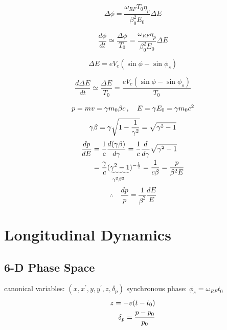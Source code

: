 \documentclass[10pt,a4paper]{ltjsarticle}
\begin{document}
\begin{equation}
    \Delta \phi = \frac{\omega_{RF} T_0 \eta_p}{\beta_0^2 E_0}\Delta E
\end{equation}

\begin{equation}
    \frac{d\phi}{dt} \simeq \frac{\Delta\phi}{T_0} = \frac{\omega_{RF}\eta_p}{\beta_0^2 E_0}\Delta E
\end{equation}

\begin{equation}
    \Delta E = e V_c (\sin \phi - \sin \phi_s)
\end{equation}

\begin{equation}
    \frac{d\Delta E}{dt} \simeq \frac{\Delta E}{T_0}= \frac{e V_c (\sin\phi - \sin\phi_s)}{T_0}
\end{equation}

\begin{tcolorbox}[title=式 (\ref{delta_p}) の導出]
    
    \begin{align}
        p = mv = \gamma m_0 \beta c\,  , \quad E = \gamma E_0 = \gamma m_0 c^2 \notag
    \end{align}
    \begin{equation}
        \gamma \beta = \gamma \sqrt{1-\frac{1}{\gamma^2}} \notag = \sqrt{\gamma^2 -1} \notag
    \end{equation}
    \begin{align}
        \frac{dp}{dE} & = \frac{1}{c}\frac{d(\gamma \beta)}{d\gamma} = \frac{1}{c}\frac{d}{d\gamma}\sqrt{\gamma^2 -1} \notag \\
        & = \frac{\gamma}{c} \underset{\gamma^2\beta^2}{(\uwave{\gamma^2 -1}})^{-\frac{1}{2}} = \frac{1}{c\beta}
        = \frac{p}{\beta^2 E}\notag
    \end{align}
    \begin{equation}
        \therefore \quad \frac{dp}{p} = \frac{1}{\beta^2}\frac{dE}{E} \tag{C.1}
    \end{equation}
\end{tcolorbox}

%
\section{Longitudinal Dynamics}
\subsection{6-D Phase Space}
canonical variables: $(x, x^{'}, y, y^{'}, z, \delta_p)$ synchronous phase: $\phi_s =\omega_{RF} t_0$
%
\begin{align}
     z = -v(t-t_0) \notag \\
     \delta_p =\frac{p-p_0}{p_0} \notag
\end{align}
%
\end{document}
